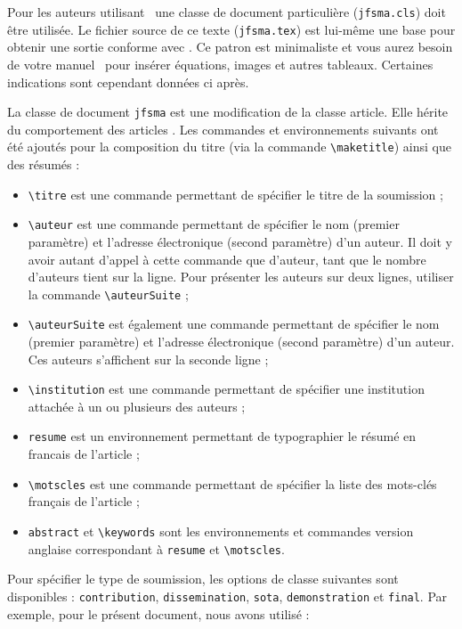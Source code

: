 \documentclass[demonstration]{jfsma}
\begin{document}
Pour les auteurs utilisant \LaTeXe\ une classe de document particulière
(\texttt{jfsma.cls}) doit être utilisée. Le fichier source de ce texte
(\texttt{jfsma.tex}) est lui-même une base pour obtenir une sortie conforme avec
\LaTeXe. Ce patron est minimaliste et vous aurez besoin de votre manuel \LaTeXe\
pour insérer équations, images et autres tableaux. Certaines indications sont
cependant données ci après.

La classe de document \texttt{jfsma} est une modification de la classe article.
Elle hérite du comportement des articles \LaTeXe. Les commandes et
environnements suivants ont été ajoutés pour la composition du titre (via la
commande \verb|\maketitle|) ainsi que des résumés :
\begin{itemize}
\item \verb|\titre| est une commande permettant de spécifier le titre de la
  soumission ;
\item \verb|\auteur| est une commande permettant de spécifier le nom (premier
  paramètre) et l'adresse électronique (second paramètre) d'un auteur. Il doit y
  avoir autant d'appel à cette commande que d'auteur, tant que le nombre
  d'auteurs tient sur la ligne. Pour présenter les auteurs sur deux lignes,
  utiliser la commande \verb|\auteurSuite| ;
\item \verb|\auteurSuite| est également une commande permettant de spécifier le
  nom (premier paramètre) et l'adresse électronique (second paramètre) d'un
  auteur. Ces auteurs s'affichent sur la seconde ligne ;
\item \verb|\institution| est une commande permettant de spécifier une
  institution attachée à un ou plusieurs des auteurs ;
\item \verb|resume| est un environnement permettant de typographier le résumé en
  francais de l'article ;
\item \verb|\motscles| est une commande permettant de spécifier la liste des
  mots-clés français de l'article ;
\item \verb|abstract| et \verb|\keywords| sont les environnements et commandes
  version anglaise correspondant à \verb|resume| et \verb|\motscles|.
\end{itemize}
Pour spécifier le type de soumission, les options de classe suivantes sont
disponibles : \texttt{contribution}, \texttt{dissemination}, \texttt{sota},
\texttt{demonstration} et \texttt{final}. Par exemple, pour le présent document,
nous avons utilisé :
\end{document}
